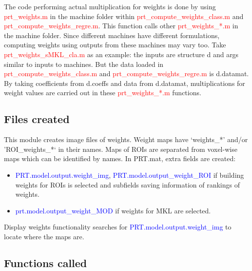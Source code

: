 The code performing actual multiplication for weights is done by using \textcolor{red}{prt\_weights.m} in the machine folder within \textcolor{red}{prt\_compute\_weights\_class.m} and \textcolor{red}{prt\_compute\_weights\_regre.m}. This function calls other \textcolor{red}{prt\_weights\_*.m} in the machine folder. Since different machines have different formulations, computing weights using outputs from these machines may vary too. Take \textcolor{red}{prt\_weights\_sMKL\_cla.m} as an example: the inputs are structure d and args similar to inputs to machines. But the data loaded in \textcolor{red}{prt\_compute\_weights\_class.m} and \textcolor{red}{prt\_compute\_weights\_regre.m} is d.datamat. By taking coefficients from d.coeffs and data from d.datamat, multiplications for weight values are carried out in these \textcolor{red}{prt\_weights\_*.m} functions.



\subsection{Files created}

This module creates image files of weights. Weight maps have ‘weights\_*’ and/or ’ROI\_weights\_*‘ in their names. Maps of ROIs are separated from voxel-wise maps which can be identified by names. In PRT.mat, extra fields are created:

\begin{itemize}
\item \textcolor{blue}{PRT.model.output.weight\_img}, \textcolor{blue}{PRT.model.output\_weight\_ROI} if building weights for ROIs is selected and subfields saving information of rankings of weights.

\item \textcolor{blue}{prt.model.output\_weight\_MOD} if weights for MKL are selected.

\end{itemize}

Display weights functionality searches for \textcolor{blue}{PRT.model.output.weight\_img} to locate where the maps are.




\subsection{Functions called}


